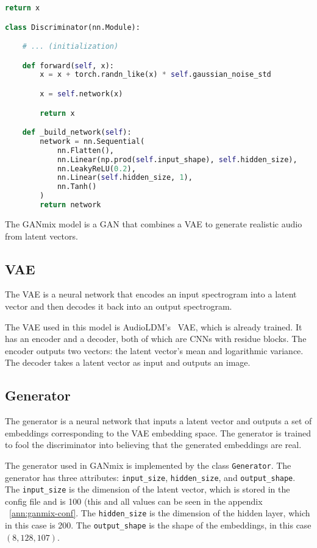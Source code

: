 \begin{lstlisting}[language=Python, caption={Implementation of the GANmix model.}]
        return x

class Discriminator(nn.Module):

    # ... (initialization)

    def forward(self, x):
        x = x + torch.randn_like(x) * self.gaussian_noise_std

        x = self.network(x)

        return x

    def _build_network(self):
        network = nn.Sequential(
            nn.Flatten(),
            nn.Linear(np.prod(self.input_shape), self.hidden_size),
            nn.LeakyReLU(0.2),
            nn.Linear(self.hidden_size, 1),
            nn.Tanh()
        )
        return network
\end{lstlisting}

The GANmix model is a \ac{GAN} that combines a \ac{VAE} to generate realistic audio from latent vectors.

\subsection{VAE}
The \ac{VAE} is a neural network that encodes an input spectrogram into a latent vector and then decodes it back into an output spectrogram.

The \ac{VAE} used in this model is AudioLDM's~\cite{liu_audioldm_2023} \ac{VAE}, which is already trained. It has an encoder and a decoder, both of which are \acp{CNN} with residue blocks. The encoder outputs two vectors: the latent vector's mean and logarithmic variance. The decoder takes a latent vector as input and outputs an image.

\subsection{Generator}
The generator is a neural network that inputs a latent vector and outputs a set of embeddings corresponding to the \ac{VAE} embedding space. The generator is trained to fool the discriminator into believing that the generated embeddings are real.

The generator used in GANmix is implemented by the class \texttt{Generator}. The generator has three attributes: \texttt{input\_size}, \texttt{hidden\_size}, and \texttt{output\_shape}. The \texttt{input\_size} is the dimension of the latent vector, which is stored in the config file and is 100 (this and all values can be seen in the appendix ~\ref{ann:ganmix-conf}. The \texttt{hidden\_size} is the dimension of the hidden layer, which in this case is 200. The \texttt{output\_shape} is the shape of the embeddings, in this case $(8, 128, 107)$.

